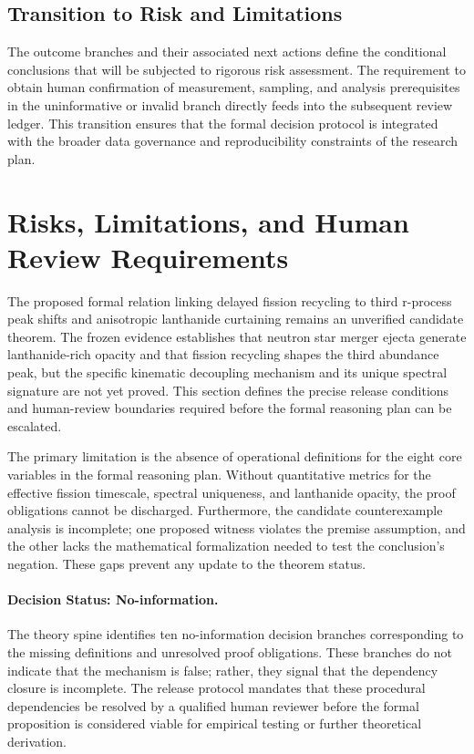 \documentclass[conference]{IEEEtran}
\begin{document}
\subsection{Transition to Risk and Limitations}
The outcome branches and their associated next actions define the conditional conclusions that will be subjected to rigorous risk assessment. The requirement to obtain human confirmation of measurement, sampling, and analysis prerequisites in the uninformative or invalid branch directly feeds into the subsequent review ledger. This transition ensures that the formal decision protocol is integrated with the broader data governance and reproducibility constraints of the research plan.

\section{Risks, Limitations, and Human Review Requirements}
The proposed formal relation linking delayed fission recycling to third r-process peak shifts and anisotropic lanthanide curtaining remains an unverified candidate theorem. The frozen evidence establishes that neutron star merger ejecta generate lanthanide-rich opacity and that fission recycling shapes the third abundance peak, but the specific kinematic decoupling mechanism and its unique spectral signature are not yet proved. This section defines the precise release conditions and human-review boundaries required before the formal reasoning plan can be escalated.~\cite{cite_403b23aaa35e6b92,cite_b89745a07eed477d,cite_bbb76a303fab42b5}

The primary limitation is the absence of operational definitions for the eight core variables in the formal reasoning plan. Without quantitative metrics for the effective fission timescale, spectral uniqueness, and lanthanide opacity, the proof obligations cannot be discharged. Furthermore, the candidate counterexample analysis is incomplete; one proposed witness violates the premise assumption, and the other lacks the mathematical formalization needed to test the conclusion's negation. These gaps prevent any update to the theorem status.

\paragraph{Decision Status: No-information.} The theory spine identifies ten no-information decision branches corresponding to the missing definitions and unresolved proof obligations. These branches do not indicate that the mechanism is false; rather, they signal that the dependency closure is incomplete. The release protocol mandates that these procedural dependencies be resolved by a qualified human reviewer before the formal proposition is considered viable for empirical testing or further theoretical derivation.
\end{document}
